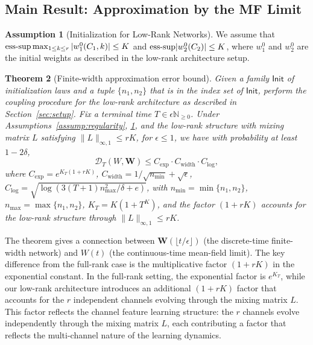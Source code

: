 \documentclass[nohyperref]{article}
\theoremstyle{plain}
\newtheorem{theorem}{Theorem}[section]
\theoremstyle{definition}
\newtheorem{assumption}[theorem]{Assumption}
\theoremstyle{remark}
\begin{document}
\subsection{Main Result: Approximation by the MF Limit}

\begin{assumption}[Initialization for Low-Rank Networks]
\label{assump:quant-init}
We assume that ${\rm ess\text{-}sup}\max_{1\le k\le r}|w_1^0(C_1,k)| \le K$ and ${\rm ess\text{-}sup}|w_2^0(C_2)| \le K$, where $w_1^0$ and $w_2^0$ are the initial weights as described in the low-rank architecture setup.
\end{assumption}

\begin{theorem}[Finite-width approximation error bound]
\label{thm:quantitative-lowrank}
Given a family $\mathsf{Init}$ of initialization laws and a tuple $\{n_1, n_2\}$ that is in the index set of $\mathsf{Init}$, perform the coupling procedure for the low-rank architecture as described in Section~\ref{sec:setup}. Fix a terminal time $T \in \epsilon\mathbb{N}_{\ge 0}$. Under Assumptions~\ref{assump:regularity}, \ref{assump:quant-init}, and the low-rank structure with mixing matrix $L$ satisfying $\|L\|_{\infty,1} \le rK$, for $\epsilon \le 1$, we have with probability at least $1-2\delta$,
\[
\mathscr{D}_T(W, \mathbf{W}) \le C_{\exp} \cdot C_{\text{width}} \cdot C_{\log},
\]
where $C_{\exp} = e^{K_T(1+rK)}$, $C_{\text{width}} = 1/\sqrt{n_{\min}} + \sqrt{\epsilon}$, $C_{\log} = \sqrt{\log(3(T+1)n_{\max}^2/\delta + e)}$, with $n_{\min} = \min\{n_1, n_2\}$, $n_{\max} = \max\{n_1, n_2\}$, $K_T = K(1+T^K)$, and the factor $(1+rK)$ accounts for the low-rank structure through $\|L\|_{\infty,1} \le rK$.

\end{theorem}

The theorem gives a connection between $\mathbf{W}(\lfloor t/\epsilon\rfloor)$ (the discrete-time finite-width network) and $W(t)$ (the continuous-time mean-field limit). The key difference from the full-rank case \cite{nguyen2023rigorousframeworkmeanfield} is the multiplicative factor $(1+rK)$ in the exponential constant. In the full-rank setting, the exponential factor is $e^{K_T}$, while our low-rank architecture introduces an additional $(1+rK)$ factor that accounts for the $r$ independent channels evolving through the mixing matrix $L$. This factor reflects the channel feature learning structure: the $r$ channels evolve independently through the mixing matrix $L$, each contributing a factor that reflects the multi-channel nature of the learning dynamics.
\end{document}
